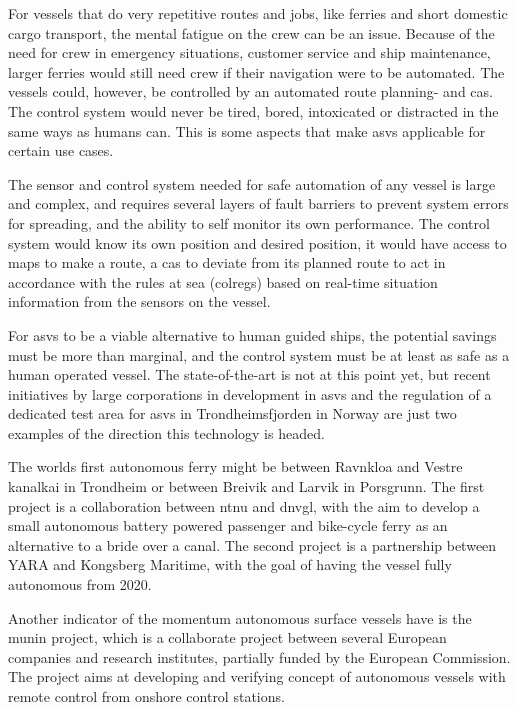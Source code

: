 For vessels that do very repetitive routes and jobs, like ferries and short domestic cargo transport, the mental fatigue on the crew can be an issue. Because of the need for crew in emergency situations, customer service and ship maintenance, larger ferries would still need crew if their navigation were to be automated. The vessels could, however, be controlled by an automated route planning- and \gls{cas}. The control system would never be tired, bored, intoxicated or distracted in the same ways as humans can. This is some aspects that make \glspl{asv} applicable for certain use cases.

The sensor and control system needed for safe automation of any vessel is large and complex, and requires several layers of fault barriers to prevent system errors for spreading, and the ability to self monitor its own performance. The control system would know its own position and desired position, it would have access to maps to make a route, a \gls{cas} to deviate from its planned route to act in accordance with the rules at sea (\gls{colregs}) based on real-time situation information from the sensors on the vessel.

For \glspl{asv} to be a viable alternative to human guided ships, the potential savings must be more than marginal, and the control system must be at least as safe as a human operated vessel. The state-of-the-art is not at this point yet, but recent initiatives by large corporations in development in \glspl{asv} and the regulation of a dedicated test area for \glspl{asv} in Trondheimsfjorden in Norway are just two examples of the direction this technology is headed.

The worlds first autonomous ferry might be between Ravnkloa and Vestre kanalkai in Trondheim or between Breivik and Larvik in Porsgrunn. The first project is a collaboration between \gls{ntnu} and \gls{dnvgl}, with the aim to develop a small autonomous battery powered passenger and bike-cycle ferry as an alternative to a bride over a canal. The second project is a partnership between YARA and Kongsberg Maritime, with the goal of having the vessel fully autonomous from 2020.

Another indicator of the momentum autonomous surface vessels have is the \gls{munin} project, which is a collaborate project between several European companies and research institutes, partially funded by the European Commission. The project aims at developing and verifying concept of autonomous vessels with remote control from onshore control stations.


